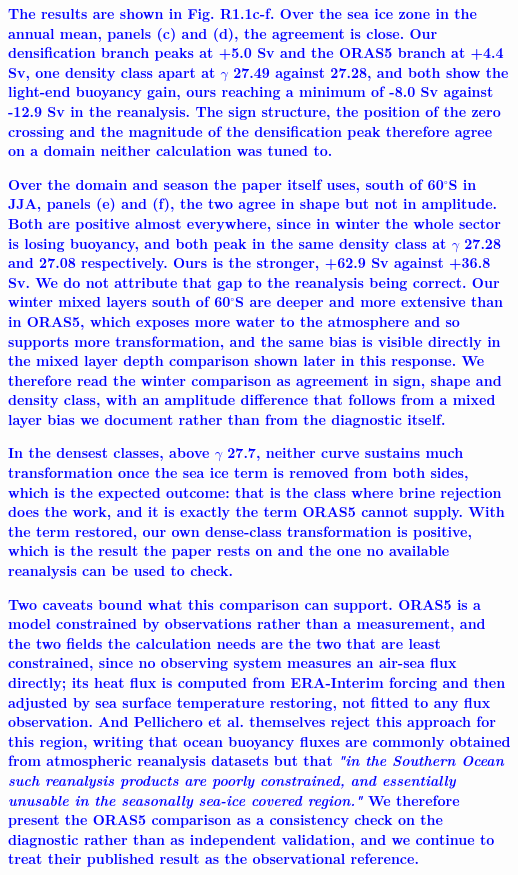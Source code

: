 \documentclass[pdflatex,sn-nature]{sn-jnl}
\begin{document}
\noindent\textcolor{blue}{\textbf{The results are shown in Fig. R1.1c-f. Over the sea ice zone in the annual mean, panels (c) and (d), the agreement is close. Our densification branch peaks at +5.0 Sv and the ORAS5 branch at +4.4 Sv, one density class apart at $\gamma$ 27.49 against 27.28, and both show the light-end buoyancy gain, ours reaching a minimum of -8.0 Sv against -12.9 Sv in the reanalysis. The sign structure, the position of the zero crossing and the magnitude of the densification peak therefore agree on a domain neither calculation was tuned to.}}


\noindent\textcolor{blue}{\textbf{Over the domain and season the paper itself uses, south of 60$^\circ$S in JJA, panels (e) and (f), the two agree in shape but not in amplitude. Both are positive almost everywhere, since in winter the whole sector is losing buoyancy, and both peak in the same density class at $\gamma$ 27.28 and 27.08 respectively. Ours is the stronger, +62.9 Sv against +36.8 Sv. We do not attribute that gap to the reanalysis being correct. Our winter mixed layers south of 60$^\circ$S are deeper and more extensive than in ORAS5, which exposes more water to the atmosphere and so supports more transformation, and the same bias is visible directly in the mixed layer depth comparison shown later in this response. We therefore read the winter comparison as agreement in sign, shape and density class, with an amplitude difference that follows from a mixed layer bias we document rather than from the diagnostic itself.}}


\noindent\textcolor{blue}{\textbf{In the densest classes, above $\gamma$ 27.7, neither curve sustains much transformation once the sea ice term is removed from both sides, which is the expected outcome: that is the class where brine rejection does the work, and it is exactly the term ORAS5 cannot supply. With the term restored, our own dense-class transformation is positive, which is the result the paper rests on and the one no available reanalysis can be used to check.}}


\noindent\textcolor{blue}{\textbf{Two caveats bound what this comparison can support. ORAS5 is a model constrained by observations rather than a measurement, and the two fields the calculation needs are the two that are least constrained, since no observing system measures an air-sea flux directly; its heat flux is computed from ERA-Interim forcing and then adjusted by sea surface temperature restoring, not fitted to any flux observation. And Pellichero et al. themselves reject this approach for this region, writing that ocean buoyancy fluxes are commonly obtained from atmospheric reanalysis datasets but that \textit{"in the Southern Ocean such reanalysis products are poorly constrained, and essentially unusable in the seasonally sea-ice covered region."} We therefore present the ORAS5 comparison as a consistency check on the diagnostic rather than as independent validation, and we continue to treat their published result as the observational reference.}}
\end{document}
